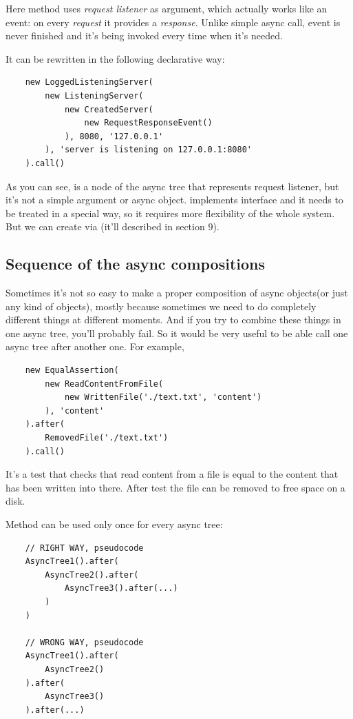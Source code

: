 \documentclass{article}
\begin{document}
Here method  uses \textit{request listener} as argument, which actually works like an event: on every \textit{request} it provides a  \textit{response}. Unlike simple async call, event is never finished and it's being invoked every time when it's needed.

It can be rewritten in the following declarative way:

\begin{verbatim}
    new LoggedListeningServer(
        new ListeningServer(
            new CreatedServer(
                new RequestResponseEvent()
            ), 8080, '127.0.0.1'
        ), 'server is listening on 127.0.0.1:8080'
    ).call()
\end{verbatim}

As you can see,  is a node of the async tree that represents request listener, but it's not a simple argument or async object.  implements  interface and it needs to be treated in a special way, so it requires more flexibility of the whole system. But we can create  via  (it'll described in section 9).

\subsection{Sequence of the async compositions}

Sometimes it's not so easy to make a proper composition of async objects(or just any kind of objects), mostly because sometimes we need to do completely different things at different moments. And if you try to combine these things in one async tree, you'll probably fail. So it would be very useful to be able call one async tree after another one. For example,

\begin{verbatim}
    new EqualAssertion(
        new ReadContentFromFile(
            new WrittenFile('./text.txt', 'content')
        ), 'content'
    ).after(
        RemovedFile('./text.txt')
    ).call()
\end{verbatim}

It's a test that checks that read content from a file is equal to the content that has been written into there. After test the file can be removed to free space on a disk.

Method  can be used only once for every async tree:

\begin{verbatim}
    // RIGHT WAY, pseudocode
    AsyncTree1().after(
        AsyncTree2().after(
            AsyncTree3().after(...)
        )
    )

    // WRONG WAY, pseudocode
    AsyncTree1().after(
        AsyncTree2()
    ).after(
        AsyncTree3()
    ).after(...)
\end{verbatim}
\end{document}
